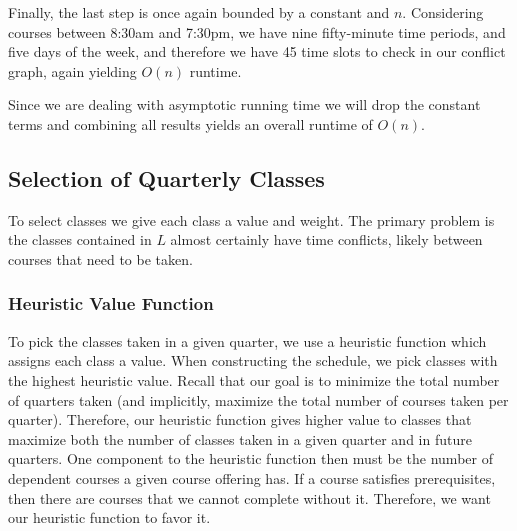 \documentclass[11pt]{article} %
\begin{document}
Finally, the last step is once again bounded by a constant and $n$.  Considering
courses between 8:30am and 7:30pm, we have nine fifty-minute time periods, and
five days of the week, and therefore we have 45 time slots to check in our
conflict graph, again yielding $O(n)$ runtime.

Since we are dealing with asymptotic running time we will drop the constant
terms and combining all results yields an overall runtime of $O(n)$.

\subsection{Selection of Quarterly Classes} To select classes we give each class
a value and weight.  The primary problem is the classes contained in $L$
almost certainly have time conflicts, likely between courses that need to be
taken.  

\subsubsection{Heuristic Value Function} To pick the classes taken in a given quarter,
we use a heuristic function which assigns
each class a value.  When constructing the schedule, we pick classes with the
highest heuristic value.  Recall that our goal is to minimize the total number
of quarters taken (and implicitly, maximize the total number of courses taken
per quarter).  Therefore, our heuristic function gives higher value to classes
that maximize both the number of classes taken in a given quarter and in future
quarters.  One component to the heuristic function then must be the number of
dependent courses a given course offering has.  If a course satisfies
prerequisites, then there are courses that we cannot complete without it.
Therefore, we want our heuristic function to favor it.
\end{document}
